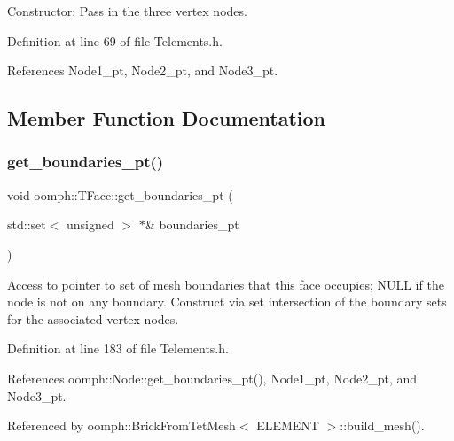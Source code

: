 Constructor\+: Pass in the three vertex nodes. 



Definition at line 69 of file Telements.\+h.



References Node1\+\_\+pt, Node2\+\_\+pt, and Node3\+\_\+pt.



\subsection{Member Function Documentation}
\mbox{\label{classoomph_1_1TFace_a603fb029127a3899e988d23e00615c22}} 
\subsubsection{\texorpdfstring{get\+\_\+boundaries\+\_\+pt()}{get\_boundaries\_pt()}}
{\footnotesize\ttfamily void oomph\+::\+T\+Face\+::get\+\_\+boundaries\+\_\+pt (\begin{DoxyParamCaption}\item[{std\+::set$<$ unsigned $>$ $\ast$\&}]{boundaries\+\_\+pt }\end{DoxyParamCaption})\hspace{0.3cm}{\ttfamily [inline]}}



Access to pointer to set of mesh boundaries that this face occupies; N\+U\+LL if the node is not on any boundary. Construct via set intersection of the boundary sets for the associated vertex nodes. 



Definition at line 183 of file Telements.\+h.



References oomph\+::\+Node\+::get\+\_\+boundaries\+\_\+pt(), Node1\+\_\+pt, Node2\+\_\+pt, and Node3\+\_\+pt.



Referenced by oomph\+::\+Brick\+From\+Tet\+Mesh$<$ E\+L\+E\+M\+E\+N\+T $>$\+::build\+\_\+mesh().

\mbox{\label{classoomph_1_1TFace_ab36cf33b87bbadeb6d66e6583ae467c8}} 
